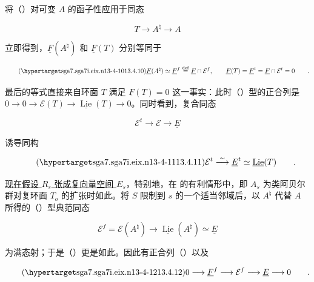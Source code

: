 \noindent
将（）对可变 $A$ 的函子性应用于同态

\begin{equation*}
 T\longrightarrow A^\natural\longrightarrow A
\end{equation*}

\noindent
立即得到，$\underline F(A^\natural)$ 和 $\underline F(T)$ 分别等同于

\begin{equation}\tag{\SGARefTarget{sga7.sga7i.eix.n13-4-10}{13.4.10}}
 \underline F(A^\natural)\simeq
 \underline F^f\stackrel{\mathrm{def}}{=}
 \underline F\cap\mathcal E^f,
 \qquad
 \underline F(T)=\underline F^t=
 \underline F\cap\mathcal E^t=0\qquad .
\end{equation}

\noindent
最后的等式直接来自环面 $T$ 满足 $\underline F(T)=0$ 这一事实：此时（）型的正合列是 $0\longrightarrow0\longrightarrow\mathcal E(T)\longrightarrow\underline{\operatorname{Lie}}(T)\longrightarrow0$。同时看到，复合同态

\begin{equation*}
 \mathcal E^t\longrightarrow\mathcal E\longrightarrow\underline E
\end{equation*}

\noindent
诱导同构

\begin{equation}\tag{\SGARefTarget{sga7.sga7i.eix.n13-4-11}{13.4.11}}
 \mathcal E^t\stackrel{\sim}{\longrightarrow}\underline E^t
 \simeq\underline{\operatorname{Lie}}(T)\qquad .
\end{equation}

\noindent
\underline{现在假设 $R_s$ 张成复向量空间 $E_s$}，特别地，在  的有利情形中，即 $A_s$ 为类阿贝尔群对复环面 $T_o$ 的扩张时如此。将 $S$ 限制到 $s$ 的一个适当邻域后，以 $A^\natural$ 代替 $A$ 所得的（）型典范同态

\begin{equation*}
 \mathcal E^f=\mathcal E(A^\natural)
 \longrightarrow\underline{\operatorname{Lie}}(A^\natural)
 \simeq\underline E
\end{equation*}

\noindent
为满态射；于是（）更是如此。因此有正合列（）以及

\begin{equation}\tag{\SGARefTarget{sga7.sga7i.eix.n13-4-12}{13.4.12}}
 0\longrightarrow\underline F^f\longrightarrow\mathcal E^f
 \longrightarrow\underline E\longrightarrow0\qquad .
\end{equation}

